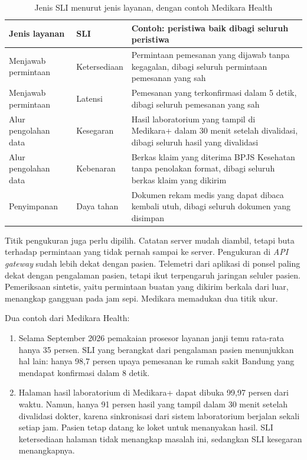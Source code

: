 \begin{table}[!htb]
  \centering
  \caption{Jenis SLI menurut jenis layanan, dengan contoh Medikara Health}
  \label{tab:ch11-jenis-sli}
  \footnotesize
  \begin{tabularx}{\textwidth}{>{\raggedright\arraybackslash}p{2.0cm} >{\raggedright\arraybackslash}p{1.8cm} >{\raggedright\arraybackslash}X}
    \hline
    \textbf{Jenis layanan} & \textbf{SLI} & \textbf{Contoh: peristiwa baik dibagi seluruh peristiwa} \\ \hline
    Menjawab permintaan & Ketersediaan & Permintaan pemesanan yang dijawab tanpa kegagalan,
      dibagi seluruh permintaan pemesanan yang sah \\ \hline
    Menjawab permintaan & Latensi & Pemesanan yang terkonfirmasi dalam 5 detik, dibagi seluruh
      pemesanan yang sah \\ \hline
    Alur pengolahan data & Kesegaran & Hasil laboratorium yang tampil di Medikara+ dalam 30 menit
      setelah divalidasi, dibagi seluruh hasil yang divalidasi \\ \hline
    Alur pengolahan data & Kebenaran & Berkas klaim yang diterima BPJS Kesehatan tanpa
      penolakan format, dibagi seluruh berkas klaim yang dikirim \\ \hline
    Penyimpanan & Daya tahan & Dokumen rekam medis yang dapat dibaca kembali utuh, dibagi
      seluruh dokumen yang disimpan \\ \hline
  \end{tabularx}
\end{table}

Titik pengukuran juga perlu dipilih. Catatan server mudah diambil, tetapi buta terhadap
permintaan yang tidak pernah sampai ke server. Pengukuran di \textit{API gateway} sudah lebih
dekat dengan pasien. Telemetri dari aplikasi di ponsel paling dekat dengan pengalaman pasien,
tetapi ikut terpengaruh jaringan seluler pasien. Pemeriksaan sintetis, yaitu permintaan buatan yang
dikirim berkala dari luar, menangkap gangguan pada jam sepi. Medikara memadukan dua titik ukur.

Dua contoh dari Medikara Health:
\begin{enumerate}
  \item Selama September 2026 pemakaian prosesor layanan janji temu rata-rata hanya 35 persen.
        SLI yang berangkat dari pengalaman pasien menunjukkan hal lain: hanya 98,7 persen
        upaya pemesanan ke rumah sakit Bandung yang mendapat konfirmasi dalam 8 detik.
  \item Halaman hasil laboratorium di Medikara+ dapat dibuka 99,97 persen dari waktu. Namun,
        hanya 91 persen hasil yang tampil dalam 30 menit setelah divalidasi dokter, karena
        sinkronisasi dari sistem laboratorium berjalan sekali setiap jam. Pasien tetap datang ke
        loket untuk menanyakan hasil. SLI ketersediaan halaman tidak menangkap masalah ini,
        sedangkan SLI kesegaran menangkapnya.
\end{enumerate}

